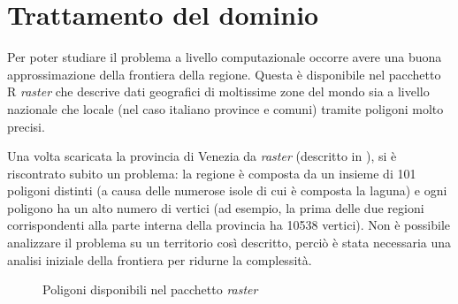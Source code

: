 \documentclass[a4paper,11pt,twoside,openright]{book}							%
\begin{document}
\section{Trattamento del dominio}

Per poter studiare il problema a livello computazionale occorre avere una buona approssimazione della frontiera della regione. Questa è disponibile nel pacchetto R \textit{raster} che descrive dati geografici di moltissime zone del mondo sia a livello nazionale che locale (nel caso italiano province e comuni) tramite poligoni molto precisi.

Una volta scaricata la provincia di Venezia da \textit{raster} (descritto in \cite{package:raster}), si è riscontrato subito un problema: la regione è composta da un insieme di 101 poligoni distinti (a causa delle numerose isole di cui è composta la laguna) e ogni poligono ha un alto numero di vertici (ad esempio, la prima delle due regioni corrispondenti alla parte interna della provincia ha 10538 vertici). Non è possibile analizzare il problema su un territorio così descritto, perciò è stata necessaria una analisi iniziale della frontiera per ridurne la complessità. 

\begin{figure}[t]
	\centering
	\caption{Poligoni disponibili nel pacchetto \textit{raster}}
	\label{fig:Ven_poligoni}
\end{figure}
\end{document}
